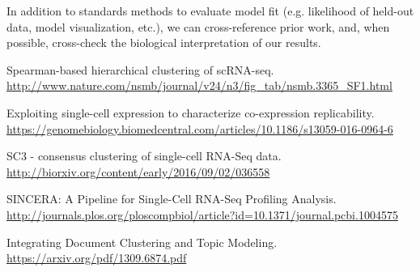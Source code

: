\documentclass[11pt]{article}
\begin{document}
In addition to standards methods to evaluate model fit (e.g. likelihood of held-out data, model visualization, etc.), we can cross-reference prior work, and, when possible, cross-check the biological interpretation of our results.

\begin{thebibliography}{9}
        Spearman-based hierarchical clustering of scRNA-seq.
        \url{http://www.nature.com/nsmb/journal/v24/n3/fig_tab/nsmb.3365_SF1.html}
         
        Exploiting single-cell expression to characterize co-expression replicability.
        \url{https://genomebiology.biomedcentral.com/articles/10.1186/s13059-016-0964-6}
         
        SC3 - consensus clustering of single-cell RNA-Seq data.
        \url{http://biorxiv.org/content/early/2016/09/02/036558}

        SINCERA: A Pipeline for Single-Cell RNA-Seq Profiling Analysis.
        \url{http://journals.plos.org/ploscompbiol/article?id=10.1371/journal.pcbi.1004575}

        Integrating Document Clustering and Topic Modeling.
        \url{https://arxiv.org/pdf/1309.6874.pdf}
\end{thebibliography}
\end{document}
